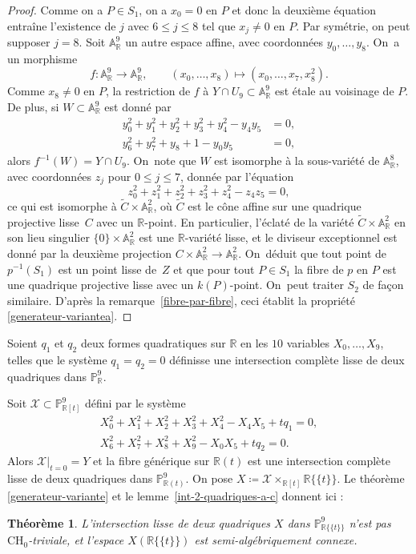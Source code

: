 \documentclass[JEP,XML,SOM,Unicode,francais,published]{cedram}
\newcommand{\CH}{\mathrm{CH}}
\newtheorem{thm}{Théorème}[section]
\theoremstyle{definition}
\newcommand{\R}{\mathbb R}
\newcommand{\A}{\mathbb A}
\renewcommand{\P}{\mathbb P}
\newcommand{\mc}[1]{\mathcal{#1}}
\newcommand{\puiseux}{\mathbb{R}\{\!\{t\}\!\}}
\begin{document}
\begin{proof}
Comme on a $P\in S_1$, on a $x_0=0$ en $P$ et donc la deuxième équation entraîne l'existence de $j$ avec $6\leq j\leq 8$ tel que $x_j\neq 0$ en $P$. Par symétrie, on peut supposer $j=8$. Soit $\A^9_\R$ un autre espace affine, avec coordonnées $y_0,\dots,y_8$. On~a un morphisme
\[f\colon \A^9_\R\to \A^9_\R,\qquad (x_0,\dots,x_8)\mapsto (x_0,\dots,x_7,x_8^2).\]
Comme $x_8\neq 0$ en $P$, la restriction de $f$ à $Y\cap U_9\subset \A^9_\R$ est étale au voisinage de $P$. De plus, si $W\subset \A^9_\R$ est donné par
\begin{align*}
y_0^2+y_1^2+y_2^2+y_3^2+y_4^2-y_4y_5&=0,\\
y_6^2+y_7^2+y_8+1-y_0y_5&=0,
\end{align*}
alors $f^{-1}(W)=Y\cap U_9$. On~note que $W$ est isomorphe à la sous-variété de $\A^8_\R$, avec coordonnées $z_j$ pour $0\leq j\leq 7$, donnée par l'équation
\[z_0^2+z_1^2+z_2^2+z_3^2+z_4^2-z_4z_5=0,\]
ce qui est isomorphe à $\tilde{C}\times \A^2_\R$, où $\tilde{C}$ est le cône affine sur une quadrique projective lisse~$C$ avec un $\R$-point. En particulier, l'éclaté de la variété $\tilde{C}\times \A^2_\R$ en son lieu singulier $\{0\}\times \A^2_\R$ est une $\R$-variété lisse, et le diviseur exceptionnel est donné par la deuxième projection $C\times \A^2_\R\to \A^2_\R$. On~déduit que tout point de $p^{-1}(S_1)$ est un point lisse de~$Z$ et que pour tout $P\in S_1$ la fibre de $p$ en $P$ est une quadrique projective lisse avec un $k(P)$-point. On~peut traiter $S_2$ de façon similaire. D'après la remarque~\ref{fibre-par-fibre}, ceci établit
la propriété \eqref{generateur-variantea}.
\end{proof}

Soient $q_1$ et $q_2$ deux formes quadratiques sur $\R$ en les $10$ variables $X_0,\dots,X_9$, telles que le système $q_1=q_2=0$ définisse une intersection complète lisse de deux quadriques dans $\P^9_{\R}$.

Soit $\mc{X}\subset \P^9_{\R[t]}$ défini par le système
\begin{align*}
X_0^2+X_1^2+X_2^2+X_3^2+X_4^2 - X_4X_5 +tq_1=0, \\
X_6^2+X_7^2+X_8^2+X_9^2 -X_0X_5 + tq_2=0.
\end{align*}
Alors $\mc{X}|_{t=0}=Y$ et la fibre générique sur $\R(t)$ est une intersection complète lisse de deux quadriques dans $\P^9_{\R(t)}$.
On pose $X\coloneqq \mc{X}\times_{\R[t]}\puiseux$.
Le théorème \ref{generateur-variante} et le lemme~\ref{int-2-quadriques-a-c} donnent ici :

\begin{thm}\label{intersection-quadriques-p9}
L'intersection lisse de deux quadriques $X$ dans $\P^9_{\puiseux}$ n'est pas $\CH_0$-triviale, et l'espace $X(\puiseux)$ est semi-algébriquement connexe.
\end{thm}
\end{document}
